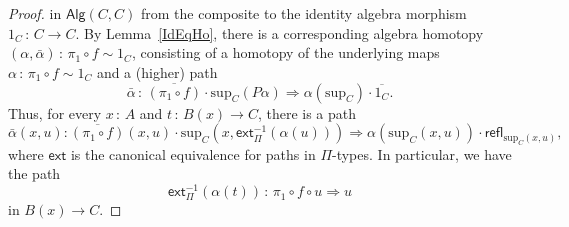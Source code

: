 \documentclass[10pt,a4paper,oneside,reqno]{amsart}
\theoremstyle{mythm}
\theoremstyle{mydef}
\theoremstyle{myrmk}
\newcommand{\co}{\,{:}\,}
\newcommand{\com}{\circ}
\newcommand{\ct}{\cdot}
\newcommand{\ext}{\mathsf{ext}}
\newcommand{\refl}{\mathsf{refl}}
\newcommand{\Palg}{\mathsf{Alg}}
\renewcommand{\sup}{\mathrm{sup}}
\begin{document}
\begin{proof}
in $\Palg(C,C)$ from the composite to the identity algebra morphism $1_C \co C \to C$.
%
By Lemma~\ref{IdEqHo}, there is a corresponding algebra homotopy $(\alpha,\bar{\alpha}) \co \pi_1 \circ f \sim 1_C$,  consisting of a homotopy of the underlying maps $\alpha \co \pi_1 \circ f \sim 1_C$ and a (higher) path
\begin{equation*}
\bar{\alpha} \co \overline{(\pi_1 \com f)} \cdot \sup_C (P \alpha) \Rightarrow \alpha(\sup_C) \cdot \overline{1_C}.
\end{equation*}
Thus, for every $x \co A$ and $t\co B(x)\to C$, there is a path
\begin{equation}\label{equ:alphabar}
\bar{\alpha}(x,u) :   \overline{(\pi_1 \com f)}(x,u) \ct \sup_C(x,\ext_\Pi^{-1}(\alpha(u))) \Rightarrow \alpha(\sup_C(x,u)) \cdot \refl_{\sup_C(x,u)},
\end{equation}
where $\ext$ is the canonical equivalence for paths in $\Pi$-types. 
In particular, we have the path 
\[
\ext_\Pi^{-1}(\alpha(t))\co\pi_1 \circ f \circ u \Rightarrow u
\]
in $B(x) \to C$.


\end{proof}
\end{document}
